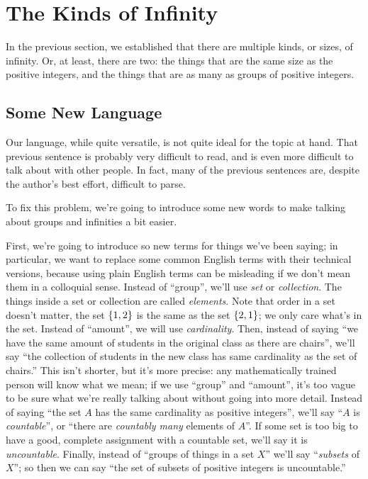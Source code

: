 \section{The Kinds of Infinity}

In the previous section, we established that there are multiple kinds, or sizes, of infinity.
Or, at least, there are two: the things that are the same size as the positive integers, and the things that are as many as groups of positive integers.

\subsection{Some New Language}

Our language, while quite versatile, is not quite ideal for the topic at hand.
That previous sentence is probably very difficult to read, and is even more difficult to talk about with other people.
In fact, many of the previous sentences are, despite the author's best effort, difficult to parse.

To fix this problem, we're going to introduce some new words to make talking about groups and infinities a bit easier.

First, we're going to introduce so new terms for things we've been saying; in particular, we want to replace some common English terms with their technical versions, because using plain English terms can be misleading if we don't mean them in a colloquial sense.
Instead of ``group'', we'll use \emph{set} or \emph{collection}.
The things inside a set or collection are called \emph{elements}.
Note that order in a set doesn't matter, the set ${\left\{ {1,2} \right\}}$ is the same as the set ${\left\{ {2,1} \right\}}$; we only care what's in the set.
Instead of ``amount'', we will use \emph{cardinality}.
Then, instead of saying ``we have the same amount of students in the original class as there are chairs'', we'll say ``the collection of students in the new class has same cardinality as the set of chairs.''
This isn't shorter, but it's more precise: any mathematically trained person will know what we mean; if we use ``group'' and ``amount'', it's too vague to be sure what we're really talking about without going into more detail.
Instead of saying ``the set $A$ has the same cardinality as positive integers'', we'll say ``$A$ is \emph{countable}'', or ``there are \emph{countably many} elements of $A$''.
If some set is too big to have a good, complete assignment with a countable set, we'll say it is \emph{uncountable}.
Finally, instead of ``groups of things in a set $X$'' we'll say ``\emph{subsets} of $X$''; so then we can say ``the set of subsets of positive integers is uncountable.''

